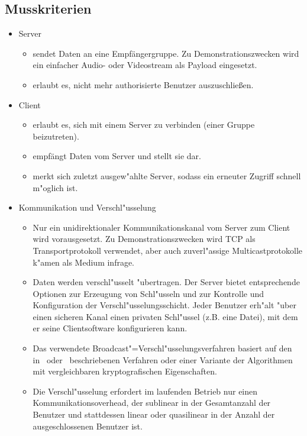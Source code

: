 \documentclass[a4paper,10pt]{article}
\begin{document}
\subsection{Musskriterien}

\begin{itemize}

\item Server
\begin{itemize}
   \item sendet Daten an eine Empfängergruppe. Zu Demonstrationszwecken wird
         ein einfacher Audio- oder Videostream als Payload eingesetzt.
   \item erlaubt es, nicht mehr authorisierte Benutzer auszuschließen.
\end{itemize}

\item Client
\begin{itemize}
   \item erlaubt es, sich mit einem Server zu verbinden (einer Gruppe beizutreten).
   \item empfängt Daten vom Server und stellt sie dar.
   \item merkt sich zuletzt ausgew"ahlte Server, sodass ein erneuter Zugriff schnell
         m"oglich ist.
\end{itemize}

\item Kommunikation und Verschl"usselung
\begin{itemize}
   \item Nur ein unidirektionaler Kommunikationskanal vom Server zum Client wird
         vorausgesetzt. Zu Demonstrationszwecken wird TCP als Transportprotokoll
         verwendet, aber auch zuverl"assige Multicastprotokolle k"amen als Medium
         infrage.
   \item Daten werden verschl"usselt "ubertragen. Der Server bietet entsprechende
         Optionen zur Erzeugung von Schl"usseln und zur Kontrolle und Konfiguration
         der Verschl"usselungsschicht. Jeder Benutzer erh"alt "uber einen sicheren
         Kanal einen privaten Schl"ussel (z.B. eine Datei), mit dem er seine
         Clientsoftware konfigurieren kann.
   \item Das verwendete Broadcast"=Verschl"usselungsverfahren basiert auf den
         in~\cite[Section~2.2]{Naor00} oder~\cite{Garg10} beschriebenen Verfahren
         oder einer Variante der Algorithmen mit vergleichbaren kryptografischen
         Eigenschaften.
   \item Die Verschl"usselung erfordert im laufenden Betrieb nur einen
         Kommunikationsoverhead, der sublinear in der Gesamtanzahl der Benutzer und
         stattdessen linear oder quasilinear in der Anzahl der ausgeschlossenen
         Benutzer ist.
\end{itemize}
\end{itemize}
\end{document}
